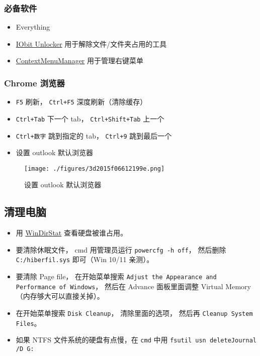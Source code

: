 \subsubsection{必备软件}
\begin{itemize}
\item Everything
\item \href{https://www.iobit.com/en/iobit-unlocker.php}{IObit Unlocker} 用于解除文件/文件夹占用的工具
\item \href{https://github.com/BluePointLilac/ContextMenuManager}{ContextMenuManager} 用于管理右键菜单
\end{itemize}

\subsubsection{Chrome 浏览器}
\begin{itemize}
\item \verb`F5` 刷新， \verb`Ctrl+F5` 深度刷新（清除缓存）
\item \verb`Ctrl+Tab` 下一个 tab， \verb`Ctrl+Shift+Tab` 上一个
\item \verb`Ctrl+数字` 跳到指定的 tab， \verb`Ctrl+9` 跳到最后一个
\item 设置 outlook 默认浏览器
\end{itemize}
\begin{figure}[ht]
\centering
\texttt{[image: ./figures/3d2015f06612199e.png]}
\caption{设置 outlook 默认浏览器} \label{fig_WinNt_2}
\end{figure}


\subsection{清理电脑}
\begin{itemize}
\item 用 \href{https://windirstat.net/}{WinDirStat} 查看硬盘被谁占用。
\item 要清除休眠文件， cmd 用管理员运行 \verb`powercfg -h off`， 然后删除 \verb`C:/hiberfil.sys` 即可（Win 10/11 亲测）。
\item 要清除 Page file， 在开始菜单搜索 \verb`Adjust the Appearance and Performance of Windows`， 然后在 Advance 面板里面调整 Virtual Memory（内存够大可以直接关掉）。
\item 在开始菜单搜索 \verb`Disk Cleanup`， 清除里面的选项， 然后再 \verb`Cleanup System Files`。
\item 如果 NTFS 文件系统的硬盘有点慢，在 \verb`cmd` 中用 \verb`fsutil usn deleteJournal /D G:`
\end{itemize}

